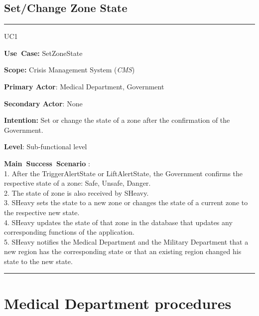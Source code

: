 \subsection{Set/Change Zone State}
\vspace{0.5cm}
\hrule
\vspace{0.5cm}
\begin{lyxlist}{UC1}
\small{
\item [\textbf{Use~Case:}] SetZoneState
\item [\textbf{Scope:}] Crisis Management System (\emph{CMS})
\item [\textbf{Primary Actor}:] Medical Department, Government
\item [\textbf{Secondary Actor}:] None
\item [\textbf{Intention:}] Set or change the state of a zone 
after the confirmation of the Government.\\
\item [\textbf{Level}:]Sub-functional level
\item [\textbf{Main~Success~Scenario}]:\\
1. After the TriggerAlertState or LiftAlertState, the Government confirms
 the respective state of a zone: Safe, Unsafe, Danger.\\
2. The state of zone is also received by SHeavy.\\
3. SHeavy sets the state to a new zone or changes the state of a current zone to 
the respective new state.\\
4. SHeavy updates the state of that zone in the database that updates any
corresponding functions of the application.\\
5. SHeavy notifies the Medical Department and the Military Department that a new 
region has the corresponding state or that an existing region changed his state
to the new state.\\
}
\end{lyxlist}
\hrule
\vspace{0.5cm} 

\section{Medical Department procedures}


